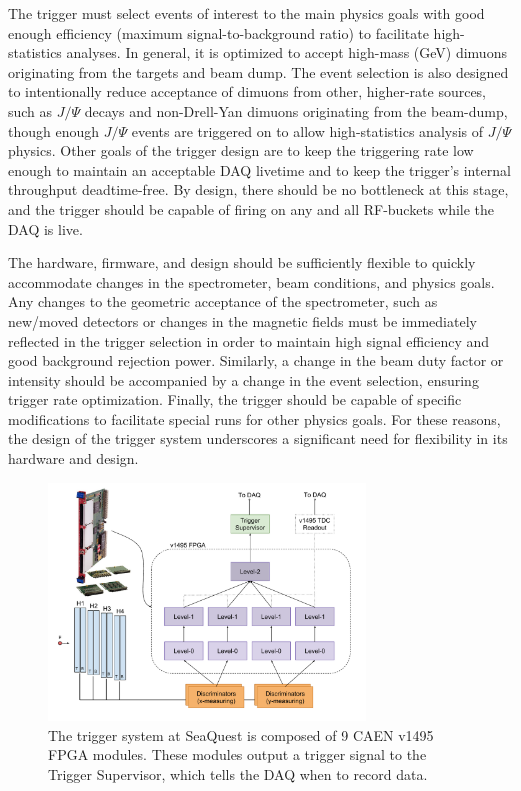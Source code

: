 The trigger must select events of interest to the main physics goals with good enough efficiency (maximum signal-to-background ratio) to facilitate high-statistics analyses. In general, it is optimized to accept high-mass (\unit[4-10]{GeV}) dimuons originating from the targets and beam dump. The event selection is also designed to intentionally reduce acceptance of dimuons from other, higher-rate sources, such as $J/\Psi$ decays and non-Drell-Yan dimuons originating from the beam-dump, though enough $J/\Psi$ events are triggered on to allow high-statistics analysis of $J/\Psi$ physics. Other goals of the trigger design are to keep the triggering rate low enough to maintain an acceptable DAQ livetime and to keep the trigger's internal throughput deadtime-free. By design, there should be no bottleneck at this stage, and the trigger should be capable of firing on any and all RF-buckets while the DAQ is live.

The hardware, firmware, and design should be sufficiently flexible to quickly accommodate changes in the spectrometer, beam conditions, and physics goals. Any changes to the geometric acceptance of the spectrometer, such as new/moved detectors or changes in the magnetic fields must be immediately reflected in the trigger selection in order to maintain high signal efficiency and good background rejection power. Similarly, a change in the beam duty factor or intensity should be accompanied by a change in the event selection, ensuring trigger rate optimization. Finally, the trigger should be capable of specific modifications to facilitate special runs for other physics goals. For these reasons, the design of the trigger system underscores a significant need for flexibility in its hardware and design.

\begin{figure}[t]
	\centering
	\includegraphics[width=0.75\textwidth]{figures/apparatus/v1495-trigger.pdf}
	\caption{The trigger system at SeaQuest is composed of 9 CAEN v1495 FPGA modules. These modules output a trigger signal to the Trigger Supervisor, which tells the DAQ when to record data.}
	\label{fig:1495-trigger}
\end{figure}


